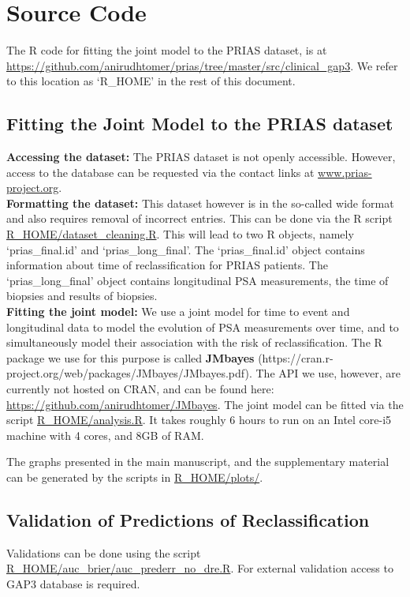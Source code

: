 \section{Source Code}
The R code for fitting the joint model to the PRIAS dataset, is at \url{https://github.com/anirudhtomer/prias/tree/master/src/clinical_gap3}. We refer to this location as `R\_HOME' in the rest of this document.

\subsection{Fitting the Joint Model to the PRIAS dataset}
\textbf{Accessing the dataset:}
The PRIAS dataset is not openly accessible. However, access to the database can be requested via the contact links at \url{www.prias-project.org}.\\

\textbf{Formatting the dataset:}
This dataset however is in the so-called wide format and also requires removal of incorrect entries. This can be done via the R script \url{R_HOME/dataset_cleaning.R}. This will lead to two R objects, namely `prias\_final.id' and `prias\_long\_final'. The `prias\_final.id' object contains information about time of reclassification for PRIAS patients. The `prias\_long\_final' object contains longitudinal PSA measurements, the time of biopsies and results of biopsies.\\

\textbf{Fitting the joint model:}
We use a joint model for time to event and longitudinal data to model the evolution of PSA measurements over time, and to simultaneously model their association with the risk of reclassification. The R package we use for this purpose is called \textbf{JMbayes} (https://cran.r-project.org/web/packages/JMbayes/JMbayes.pdf). The API we use, however, are currently not hosted on CRAN, and can be found here:
\url{https://github.com/anirudhtomer/JMbayes}. The joint model can be fitted via the script \url{R_HOME/analysis.R}. It takes roughly 6 hours to run on an Intel core-i5 machine with 4 cores, and 8GB of RAM. 

The graphs presented in the main manuscript, and the supplementary material can be generated by the scripts in \url{R_HOME/plots/}.

\subsection{Validation of Predictions of Reclassification}
Validations can be done using the script \url{R_HOME/auc_brier/auc_prederr_no_dre.R}. For external validation access to GAP3 database is required.

